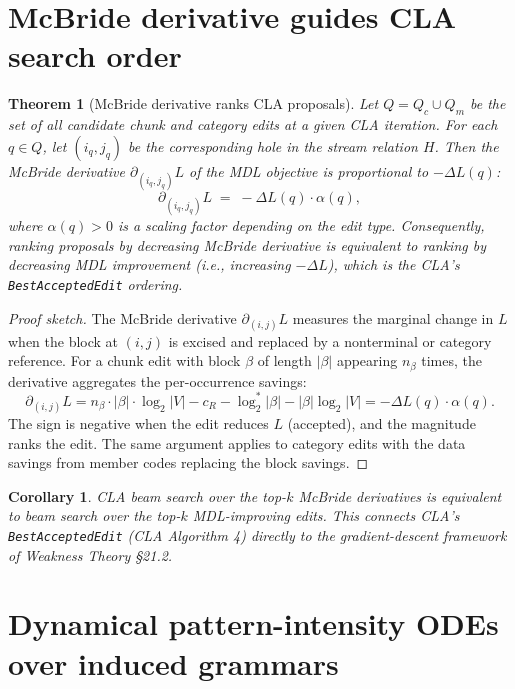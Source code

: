 \documentclass[11pt]{article}
\newtheorem{theorem}{Theorem}
\newtheorem{corollary}{Corollary}
\begin{document}
\section{McBride derivative guides CLA search order}

\begin{theorem}[McBride derivative ranks CLA proposals]
\label{thm:mcbride-ranks}
Let $Q = Q_c \cup Q_m$ be the set of all candidate chunk and category edits at a given CLA iteration.  For each $q \in Q$, let $(i_q, j_q)$ be the corresponding hole in the stream relation $H$.  Then the McBride derivative $\partial_{(i_q, j_q)} L$ of the MDL objective is proportional to $-\Delta L(q)$:
\[
  \partial_{(i_q, j_q)} L \;=\; -\Delta L(q) \cdot \alpha(q),
\]
where $\alpha(q) > 0$ is a scaling factor depending on the edit type.  Consequently, ranking proposals by decreasing McBride derivative is equivalent to ranking by decreasing MDL improvement (i.e., increasing $-\Delta L$), which is the CLA's \texttt{BestAcceptedEdit} ordering.
\end{theorem}

\begin{proof}[Proof sketch]
The McBride derivative $\partial_{(i,j)} L$ measures the marginal change in $L$ when the block at $(i,j)$ is excised and replaced by a nonterminal or category reference.  For a chunk edit with block $\beta$ of length $|\beta|$ appearing $n_\beta$ times, the derivative aggregates the per-occurrence savings:
\[
  \partial_{(i,j)} L = n_\beta \cdot |\beta| \cdot \log_2 |V| - c_R - \log_2^* |\beta| - |\beta| \log_2 |V| = -\Delta L(q) \cdot \alpha(q).
\]
The sign is negative when the edit reduces $L$ (accepted), and the magnitude ranks the edit.  The same argument applies to category edits with the data savings from member codes replacing the block savings.
\end{proof}

\begin{corollary}
\label{cor:beam-search}
CLA beam search over the top-$k$ McBride derivatives is equivalent to beam search over the top-$k$ MDL-improving edits.  This connects CLA's \texttt{BestAcceptedEdit} (CLA Algorithm 4) directly to the gradient-descent framework of Weakness Theory \S 21.2.
\end{corollary}

\section{Dynamical pattern-intensity ODEs over induced grammars}
\end{document}
